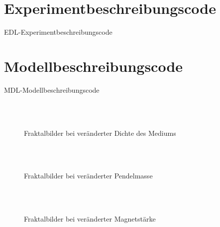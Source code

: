 \section{Experimentbeschreibungscode}

\begin{code}[H]
    \caption{EDL-Experimentbeschreibungscode}
    \label{code:edl-experimentbeschreibungscode}
\end{code}

\section{Modellbeschreibungscode}

\begin{code}[H]
	\caption{MDL-Modellbeschreibungscode}
	\label{code:mdl-modellbeschreibungscode}
\end{code}

\twocolumn

\newpage

\begin{figure}[H]
    \\
    \\
    \caption{Fraktalbilder bei veränderter Dichte des Mediums}
    \label{fig:Fraktalbilder_bei_veränderter_dichte_des_mediums}
\end{figure}

\begin{figure}[H]
    \\
    \\
    \caption{Fraktalbilder bei veränderter Pendelmasse}
    \label{fig:Fraktalbilder_bei_veränderter_pendelmasse}
\end{figure}

\begin{figure}[H]
    \\
    \\
    \caption{Fraktalbilder bei veränderter Magnetstärke}
    \label{fig:Fraktalbilder_bei_veränderter_magnetstärke}
\end{figure}

